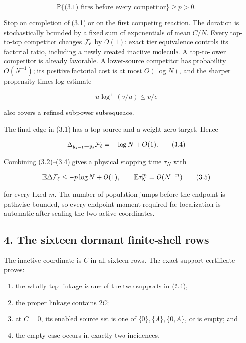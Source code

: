 \[
 \mathbb P\{\text{(3.1) fires before every competitor}\}\ge p>0. \tag{3.2}
\]

Stop on completion of (3.1) or on the first competing reaction. The
duration is stochastically bounded by a fixed sum of exponentials of
mean \(C/N\). Every top-to-top competitor changes \({\cal F}_\ell\) by
\(O(1)\): exact tier equivalence controls its factorial ratio, including
a newly created inactive molecule. A top-to-lower competitor is already
favorable. A lower-source competitor has probability \(O(N^{-1})\); its
positive factorial cost is at most \(O(\log N)\), and the sharper
propensity-times-log estimate

\[
 u\log^+(v/u)\le v/e                                  \tag{3.3}
\]

also covers a refined subpower subsequence.

The final edge in (3.1) has a top source and a weight-zero target. Hence

\[
 \Delta_{y_{j-1}\to y_j}{\cal F}_\ell
 =-\log N+O(1).                                        \tag{3.4}
\]

Combining (3.2)--(3.4) gives a physical stopping time \(\tau_N\) with

\[
 \mathbb E\Delta{\cal F}_\ell\le-p\log N+O(1),
 \qquad
 \mathbb E\tau_N^m=O(N^{-m})                           \tag{3.5}
\]

for every fixed \(m\). The number of population jumps before the
endpoint is pathwise bounded, so every endpoint moment required for
localization is automatic after scaling the two active coordinates.

\subsection{4. The sixteen dormant finite-shell
rows}

The inactive coordinate is \(C\) in all sixteen rows. The exact support
certificate proves:

\begin{enumerate}
\def\labelenumi{\arabic{enumi}.}
\tightlist
\item
  the wholly top linkage is one of the two supports in (2.4);
\item
  the proper linkage contains \(2C\);
\item
  at \(C=0\), its enabled source set is one of \(\{0\},\{A\},\{0,A\}\),
  or is empty; and
\item
  the empty case occurs in exactly two incidences.
\end{enumerate}

